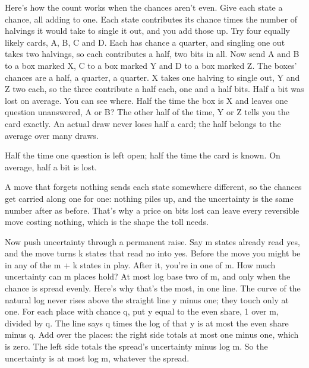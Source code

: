 \documentclass[11pt,twoside]{article}
\theoremstyle{thielethm}
\theoremstyle{thieledef}
\theoremstyle{thieledef}
\theoremstyle{thieledef}
\theoremstyle{thielethm}
\theoremstyle{thieleobs}
\theoremstyle{thielethm}
\begin{document}
Here's how the count works when the chances aren't even. Give each state a chance, all adding to one. Each state contributes its chance times the number of halvings it would take to single it out, and you add those up. Try four equally likely cards, A, B, C and D. Each has chance a quarter, and singling one out takes two halvings, so each contributes a half, two bits in all. Now send A and B to a box marked X, C to a box marked Y and D to a box marked Z. The boxes' chances are a half, a quarter, a quarter. X takes one halving to single out, Y and Z two each, so the three contribute a half each, one and a half bits. Half a bit was lost on average. You can see where. Half the time the box is X and leaves one question unanswered, A or B? The other half of the time, Y or Z tells you the card exactly. An actual draw never loses half a card; the half belongs to the average over many draws.

\begin{center}

\small Half the time one question is left open; half the time the card is known.
On average, half a bit is lost.
\end{center}

A move that forgets nothing sends each state somewhere different, so the chances get carried along one for one: nothing piles up, and the uncertainty is the same number after as before. That's why a price on bits lost can leave every reversible move costing nothing, which is the shape the toll needs.

Now push uncertainty through a permanent raise. Say m states already read yes, and the move turns k states that read no into yes. Before the move you might be in any of the m + k states in play. After it, you're in one of m. How much uncertainty can m places hold? At most log base two of m, and only when the chance is spread evenly. Here's why that's the most, in one line. The curve of the natural log never rises above the straight line y minus one; they touch only at one. For each place with chance q, put y equal to the even share, 1 over m, divided by q. The line says q times the log of that y is at most the even share minus q. Add over the places: the right side totals at most one minus one, which is zero. The left side totals the spread's uncertainty minus log m. So the uncertainty is at most log m, whatever the spread.
\end{document}
